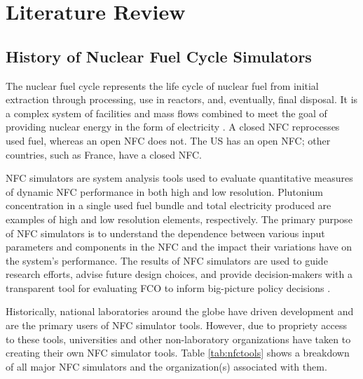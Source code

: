 \chapter{Literature Review}

\section{History of Nuclear Fuel Cycle Simulators}
The nuclear fuel cycle represents the life cycle of nuclear fuel from initial
extraction through processing, use in reactors, and, eventually, 
final disposal.
It is a complex system of facilities and mass flows 
combined to meet the goal of providing nuclear energy 
in the form of electricity \cite{yacout_modeling_2005}.
A closed \gls{NFC} reprocesses used fuel, whereas an open 
\gls{NFC} does not.  
The US has an open \gls{NFC}; other countries, such as France, 
have a closed NFC. 

\gls{NFC} simulators are system analysis tools used to evaluate 
quantitative measures of dynamic \gls{NFC} performance 
in both high and low resolution. 
Plutonium concentration in a single used fuel bundle and 
total electricity produced are examples of high and low 
resolution elements, respectively.   
The primary purpose of \gls{NFC} simulators is to understand the 
dependence between various input parameters and components 
in the \gls{NFC} and the impact their variations have on 
the system's performance. 
The results of \gls{NFC} simulators are used to guide research 
efforts, advise future design choices, and provide 
decision-makers with a transparent tool for evaluating \gls{FCO} 
to inform big-picture policy decisions \cite{yacout_modeling_2005}.

Historically, national laboratories around the globe have driven 
development and are the primary users of \gls{NFC} simulator tools. 
However, due to propriety access to these tools, universities and 
other non-laboratory organizations have taken to creating their 
own \gls{NFC} simulator tools. 
Table \ref{tab:nfctools} shows a breakdown of all major \gls{NFC} simulators
and the organization(s) associated with them.  

